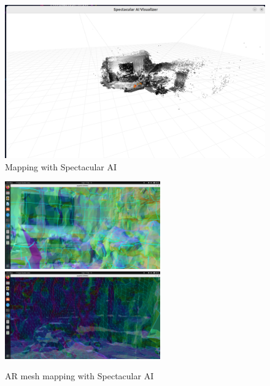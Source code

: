\begin{figure}[htbp]
	\centering
	\includegraphics[width=150mm, keepaspectratio]{figures/spectacular_ai_mapping_visu.png}
	\caption{Mapping with Spectacular AI}
	\label{fig:SPAI_mapping}
\end{figure}

\begin{figure}[htbp]
	\centering
	\includegraphics[width=67mm, keepaspectratio]{figures/spectacular_ai_mapping_ar_mesh1.png}\hspace{1cm}
	\includegraphics[width=67mm, keepaspectratio]{figures/spectacular_ai_mapping_ar_mesh2.png}\\\vspace{5mm}
	\caption{AR mesh mapping with Spectacular AI}
    \label{fig:SPAI_mesh_mapping}
\end{figure}

